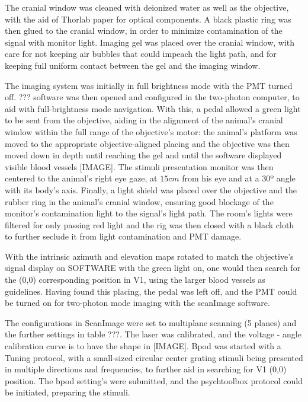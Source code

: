 The cranial window was cleaned with deionized water as well as the objective, with the aid of Thorlab paper for optical components. A black plastic ring was then glued to the cranial window, in order to minimize contamination of the signal with monitor light. Imaging gel was placed over the cranial window, with care for not keeping air bubbles that could impeach the light path, and for keeping full uniform contact between the gel and the imaging window.

The imaging system was initially in full brightness mode with the PMT turned off. ??? software was then opened and configured in the two-photon computer, to aid with full-brightness mode navigation. With this, a pedal allowed a green light to be sent from the objective, aiding in the alignment of the animal's cranial window within the full range of the objective's motor: the animal's platform was moved to the appropriate objective-aligned placing and the objective was then moved down in depth until reaching the gel and until the software displayed visible blood vessels [IMAGE].
The stimuli presentation monitor was then centered to the animal's right eye gaze, at $15 cm$ from his eye and at a $30º$ angle with its body's axis. Finally, a light shield was placed over the objective and the rubber ring in the animal's cranial window, ensuring good blockage of the monitor's contamination light to the signal's light path. The room's lights were filtered for only passing red light and the rig was then closed with a black cloth to further seclude it from light contamination and PMT damage. 

With the intrinsic azimuth and elevation maps rotated to match the objective's signal display on SOFTWARE with the green light on, one would then search for the (0,0) corresponding position in V1, using the larger blood vessels as guidelines. Having found this placing, the pedal was left off, and the PMT could be turned on for two-photon mode imaging with the scanImage software.

The configurations in ScanImage were set to multiplane scanning (5 planes) and the further settings in table ???. The laser was calibrated, and the voltage - angle calibration curve is to have the shape in [IMAGE]. Bpod was started with a Tuning protocol, with a small-sized circular center grating stimuli being presented in multiple directions and frequencies, to further aid in searching for V1 (0,0) position. The bpod setting's were submitted, and the psychtoolbox protocol could be initiated, preparing the stimuli.

